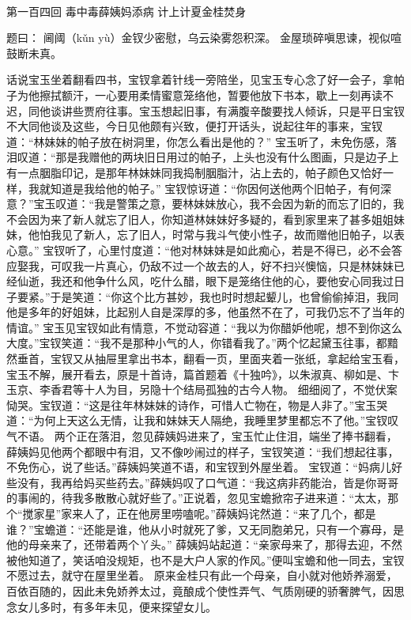 \documentclass[12pt,oneside]{book}
\begin{document}
 
 
第一百四回 毒中毒薛姨妈添病 计上计夏金桂焚身

题曰：
阃阈（kǔn yù）金钗少密慰，乌云染雾怨积深。
金屋琐碎嗔思谏，视似喧鼓断未真。

话说宝玉坐着翻看四书，宝钗拿着针线一旁陪坐，见宝玉专心念了好一会子，拿帕子为他擦拭额汗，一心要用柔情蜜意笼络他，暂要他放下书本，歇上一刻再读不迟，同他谈讲些贾府往事。宝玉想起旧事，有满腹辛酸要找人倾诉，只是平日宝钗不大同他谈及这些，今日见他颇有兴致，便打开话头，说起往年的事来，宝钗道：“林妹妹的帕子放在树洞里，你怎么看出是他的？”
宝玉听了，未免伤感，落泪叹道：“那是我赠他的两块旧日用过的帕子，上头也没有什么图画，只是边子上有一点胭脂印记，是那年林妹妹同我捣制胭脂汁，沾上去的，帕子颜色又恰好一样，我就知道是我给他的帕子。”
宝钗惊讶道：“你因何送他两个旧帕子，有何深意？”宝玉叹道：“我是警策之意，要林妹妹放心，我不会因为新的而忘了旧的，我不会因为来了新人就忘了旧人，你知道林妹妹好多疑的，看到家里来了甚多姐姐妹妹，他怕我见了新人，忘了旧人，时常与我斗气使小性子，故而赠他旧帕子，以表心意。”
宝钗听了，心里忖度道：“他对林妹妹是如此痴心，若是不得已，必不会答应娶我，可叹我一片真心，仍敌不过一个故去的人，好不扫兴懊恼，只是林妹妹已经仙逝，我还和他争什么风，吃什么醋，眼下是笼络住他的心，要他安心同我过日子要紧。”于是笑道：“你这个比方甚妙，我也时时想起颦儿，也曾偷偷掉泪，我同他是多年的好姐妹，比起别人自是深厚的多，他虽然不在了，可我仍忘不了当年的情谊。”
宝玉见宝钗如此有情意，不觉动容道：“我以为你醋妒他呢，想不到你这么大度。”宝钗笑道：“我不是那种小气的人，你错看我了。”两个忆起黛玉往事，都黯然垂首，宝钗又从抽屉里拿出书本，翻看一页，里面夹着一张纸，拿起给宝玉看，宝玉不解，展开看去，原是十首诗，篇首题着《十独吟》，以朱淑真、柳如是、卞玉京、李香君等十人为目，另隐十个结局孤独的古今人物。
细细阅了，不觉伏案恸哭。宝钗道：“这是往年林妹妹的诗作，可惜人亡物在，物是人非了。”宝玉哭道：“为何上天这么无情，让我和妹妹天人隔绝，我睡里梦里都忘不了他。”宝钗叹气不语。
两个正在落泪，忽见薛姨妈进来了，宝玉忙止住泪，端坐了捧书翻看，薛姨妈见他两个都眼中有泪，又不像吵闹过的样子，宝钗笑道：“我们想起往事，不免伤心，说了些话。”薛姨妈笑道不语，和宝钗到外屋坐着。
宝钗道：“妈病儿好些没有，我再给妈买些药去。”薛姨妈叹了口气道：“我这病非药能治，皆是你哥哥的事闹的，待我多散散心就好些了。”正说着，忽见宝蟾掀帘子进来道：“太太，那个“搅家星”家来人了，正在他房里唠嗑呢。”薛姨妈诧然道：“来了几个，都是谁？”宝蟾道：“还能是谁，他从小时就死了爹，又无同胞弟兄，只有一个寡母，是他的母亲来了，还带着两个丫头。”
薛姨妈站起道：“亲家母来了，那得去迎，不然被他知道了，笑话咱没规矩，也不是大户人家的作风。”便叫宝蟾和他一同去，宝钗不愿过去，就守在屋里坐着。
原来金桂只有此一个母亲，自小就对他娇养溺爱，百依百随的，因此未免娇养太过，竟酿成个使性弄气、气质刚硬的骄奢脾气，因思念女儿多时，有多年未见，便来探望女儿。
\end{document}
